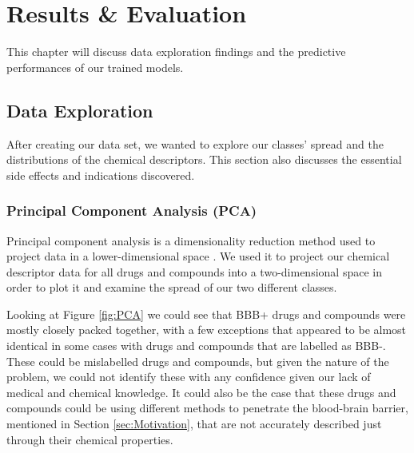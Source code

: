 \chapter{Results \& Evaluation} 



This chapter will discuss data exploration findings and the predictive performances of our trained models.

\section{Data Exploration}

After creating our data set, we wanted to explore our classes' spread and the distributions of the chemical descriptors. This section also discusses the essential side effects and indications discovered.

\subsection{Principal Component Analysis (PCA)}

Principal component analysis is a dimensionality reduction method used to project data in a lower-dimensional space \citep{PCA}. We used it to project our chemical descriptor data for all drugs and compounds into a two-dimensional space in order to plot it and examine the spread of our two different classes.

Looking at Figure \ref{fig:PCA} we could see that BBB+ drugs and compounds were mostly closely packed together, with a few exceptions that appeared to be almost identical in some cases with drugs and compounds that are labelled as BBB-. These could be mislabelled drugs and compounds, but given the nature of the problem, we could not identify these with any confidence given our lack of medical and chemical knowledge. It could also be the case that these drugs and compounds could be using different methods to penetrate the blood-brain barrier, mentioned in Section \ref{sec:Motivation}, that are not accurately described just through their chemical properties.

